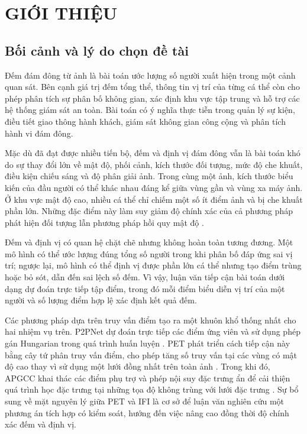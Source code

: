 \chapter{GIỚI THIỆU}
\label{chap:introduction}

\section{Bối cảnh và lý do chọn đề tài}

Đếm đám đông từ ảnh là bài toán ước lượng số người xuất hiện trong một cảnh quan sát. Bên cạnh giá trị đếm tổng thể, thông tin vị trí của từng cá thể còn cho phép phân tích sự phân bố không gian, xác định khu vực tập trung và hỗ trợ các hệ thống giám sát an toàn. Bài toán có ý nghĩa thực tiễn trong quản lý sự kiện, điều tiết giao thông hành khách, giám sát không gian công cộng và phân tích hành vi đám đông.

Mặc dù đã đạt được nhiều tiến bộ, đếm và định vị đám đông vẫn là bài toán khó do sự thay đổi lớn về mật độ, phối cảnh, kích thước đối tượng, mức độ che khuất, điều kiện chiếu sáng và độ phân giải ảnh. Trong cùng một ảnh, kích thước biểu kiến của đầu người có thể khác nhau đáng kể giữa vùng gần và vùng xa máy ảnh. Ở khu vực mật độ cao, nhiều cá thể chỉ chiếm một số ít điểm ảnh và bị che khuất phần lớn. Những đặc điểm này làm suy giảm độ chính xác của cả phương pháp phát hiện đối tượng lẫn phương pháp hồi quy mật độ \cite{nguyen2020survey}.

Đếm và định vị có quan hệ chặt chẽ nhưng không hoàn toàn tương đương. Một mô hình có thể ước lượng đúng tổng số người trong khi phân bố đáp ứng sai vị trí; ngược lại, mô hình có thể định vị được phần lớn cá thể nhưng tạo điểm trùng hoặc bỏ sót, dẫn đến sai lệch số đếm. Vì vậy, luận văn tiếp cận bài toán dưới dạng dự đoán trực tiếp tập điểm, trong đó mỗi điểm biểu diễn vị trí của một người và số lượng điểm hợp lệ xác định kết quả đếm.

Các phương pháp dựa trên truy vấn điểm tạo ra một khuôn khổ thống nhất cho hai nhiệm vụ trên. P2PNet dự đoán trực tiếp các điểm ứng viên và sử dụng phép gán Hungarian trong quá trình huấn luyện \cite{song2021p2pnet}. PET phát triển cách tiếp cận này bằng cây tứ phân truy vấn điểm, cho phép tăng số truy vấn tại các vùng có mật độ cao thay vì sử dụng một lưới đồng nhất trên toàn ảnh \cite{liu2023pet}. Trong khi đó, APGCC khai thác các điểm phụ trợ và phép nội suy đặc trưng ẩn để cải thiện quá trình học đặc trưng tại những tọa độ không trùng với lưới đặc trưng \cite{chen2024apgcc}. Sự bổ sung về mặt nguyên lý giữa PET và IFI là cơ sở để luận văn nghiên cứu một phương án tích hợp có kiểm soát, hướng đến việc nâng cao đồng thời độ chính xác đếm và định vị.

